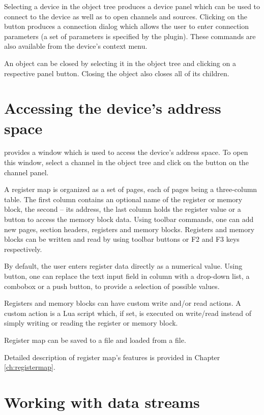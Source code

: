 \documentclass[a4paper,12pt,twoside,extrafontsizes]{memoir}
\begin{document}
Selecting a device in the object tree produces a device panel which can be used to connect to the device as well as to open channels and sources. Clicking on the  button produces a connection dialog which allows the user to enter connection parameters (a set of parameters is specified by the plugin). These commands are also available from the device's context menu.

An object can be closed by selecting it in the object tree and clicking on a respective panel button. Closing the object also closes all of its children.

\section{Accessing the device's address space}

 provides a  window which is used to access the device's address space. To open this window, select a channel in the object tree and click on the  button on the channel panel.

A register map is organized as a set of pages, each of pages being a three-column table. The first column contains an optional name of the register or memory block, the second -- its address, the last column holds the register value or a button to access the memory block data. Using toolbar commands, one can add new pages, section headers, registers and memory blocks. Registers and memory blocks can be written and read by using toolbar buttons or F2 and F3 keys respectively.

By default, the user enters register data directly as a numerical value. Using  button, one can replace the text input field in  column with a drop-down list, a combobox or a push button, to provide a selection of possible values.

Registers and memory blocks can have custom write and/or read actions. A custom action is a Lua script which, if set, is executed on write/read instead of simply writing or reading the register or memory block.

Register map can be saved to a file and loaded from a file.

Detailed description of register map's features is provided in Chapter \ref{ch:registermap}.

\section{Working with data streams}
\end{document}

